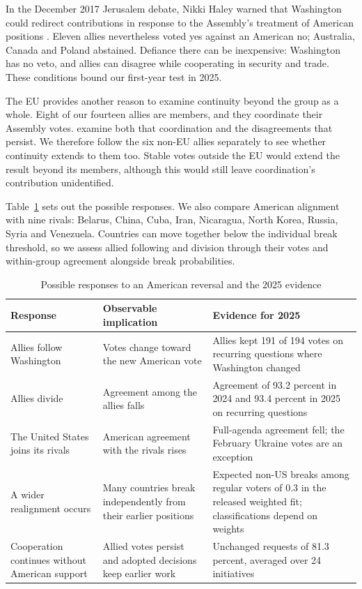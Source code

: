 \documentclass[12pt,authoryear]{elsarticle}
\begin{document}
In the December 2017 Jerusalem debate, Nikki Haley warned that Washington could redirect contributions in response to the Assembly's treatment of American positions \citep{un:2017:jerusalem}. Eleven allies nevertheless voted yes against an American no; Australia, Canada and Poland abstained. Defiance there can be inexpensive: Washington has no veto, and allies can disagree while cooperating in security and trade. These conditions bound our first-year test in 2025.

The EU provides another reason to examine continuity beyond the group as a whole. Eight of our fourteen allies are members, and they coordinate their Assembly votes. \citet{burmester:jankowski:2014} examine both that coordination and the disagreements that persist. We therefore follow the six non-EU allies separately to see whether continuity extends to them too. Stable votes outside the EU would extend the result beyond its members, although this would still leave coordination's contribution unidentified.

Table~\ref{tab:typology} sets out the possible responses. We also compare American alignment with nine rivals: Belarus, China, Cuba, Iran, Nicaragua, North Korea, Russia, Syria and Venezuela. Countries can move together below the individual break threshold, so we assess allied following and division through their votes and within-group agreement alongside break probabilities.

\begin{table}[ht]
\centering\small
\caption{Possible responses to an American reversal and the 2025 evidence}
\label{tab:typology}
\begin{tabularx}{\textwidth}{>{\raggedright\arraybackslash}p{}>{\raggedright\arraybackslash}p{}>{\raggedright\arraybackslash}X}
\toprule
Response & Observable implication & Evidence for 2025 \\
\midrule
Allies follow Washington & Votes change toward the new American vote & Allies kept 191 of 194 votes on recurring questions where Washington changed \\
\addlinespace
Allies divide & Agreement among the allies falls & Agreement of 93.2 percent in 2024 and 93.4 percent in 2025 on recurring questions \\
\addlinespace
The United States joins its rivals & American agreement with the rivals rises & Full-agenda agreement fell; the February Ukraine votes are an exception \\
\addlinespace
A wider realignment occurs & Many countries break independently from their earlier positions & Expected non-US breaks among regular voters of 0.3 in the released weighted fit; classifications depend on weights \\
\addlinespace
Cooperation continues without American support & Allied votes persist and adopted decisions keep earlier work & Unchanged requests of 81.3 percent, averaged over 24 initiatives \\
\bottomrule
\end{tabularx}
\end{table}
\FloatBarrier
\end{document}
